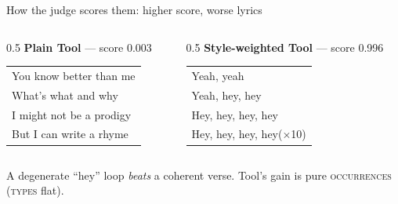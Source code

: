 \documentclass[aspectratio=169]{beamer}
\newcommand{\take}[1]{\vskip3pt\footnotesize\textcolor{accent}{#1}}
\newcommand{\metric}[1]{\textsc{#1}}   %
\begin{document}
\begin{frame}{How the judge scores them: higher score, worse lyrics}
  \vfill
  \begin{columns}[T]
    \begin{column}{0.5\textwidth}
      \centering\textbf{Plain Tool} --- score \textcolor{lo}{0.003}\par\vskip2pt
      \scriptsize\itshape
      \begin{tabular}{@{}l@{}}
      You know better than me\\
      What's what and why\\
      I might not be a prodigy\\
      But I can write a rhyme
      \end{tabular}
    \end{column}
    \begin{column}{0.5\textwidth}
      \centering\textbf{Style-weighted Tool} --- score \textcolor{hi}{0.996}\par\vskip2pt
      \scriptsize\itshape
      \begin{tabular}{@{}l@{}}
      Yeah, yeah\\
      Yeah, hey, hey\\
      Hey, hey, hey, hey\\
      Hey, hey, hey, hey\quad($\times$10)
      \end{tabular}
    \end{column}
  \end{columns}
  \vskip16pt
  \take{A degenerate ``hey'' loop \emph{beats} a coherent verse. Tool's gain is pure \metric{occurrences} (\metric{types} flat).}
  \vfill
\end{frame}
\end{document}
